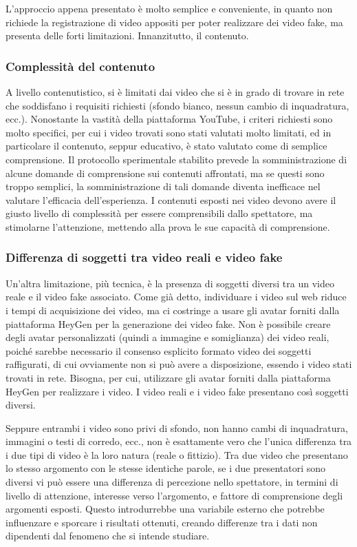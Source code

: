 L'approccio appena presentato è molto semplice e conveniente, in quanto non richiede la registrazione di video appositi per poter realizzare dei video fake, ma presenta delle forti limitazioni. Innanzitutto, il contenuto.

\subsubsection{Complessità del contenuto}

A livello contenutistico, si è limitati dai video che si è in grado di trovare in rete che soddisfano i requisiti richiesti (sfondo bianco, nessun cambio di inquadratura, ecc.). Nonostante la vastità della piattaforma YouTube, i criteri richiesti sono molto specifici, per cui i video trovati sono stati valutati molto limitati, ed in particolare il contenuto, seppur educativo, è stato valutato come di semplice comprensione. Il protocollo sperimentale stabilito prevede la somministrazione di alcune domande di comprensione sui contenuti affrontati, ma se questi sono troppo semplici, la somministrazione di tali domande diventa inefficace nel valutare l'efficacia dell'esperienza. I contenuti esposti nei video devono avere il giusto livello di complessità per essere comprensibili dallo spettatore, ma stimolarne l'attenzione, mettendo alla prova le sue capacità di comprensione.

\subsubsection{Differenza di soggetti tra video reali e video fake}

Un'altra limitazione, più tecnica, è la presenza di soggetti diversi tra un video reale e il video fake associato. Come già detto, individuare i video sul web riduce i tempi di acquisizione dei video, ma ci costringe a usare gli avatar forniti dalla piattaforma HeyGen per la generazione dei video fake. Non è possibile creare degli avatar personalizzati (quindi a immagine e somiglianza) dei video reali, poiché sarebbe necessario il consenso esplicito formato video dei soggetti raffigurati, di cui ovviamente non si può avere a disposizione, essendo i video stati trovati in rete. Bisogna, per cui, utilizzare gli avatar forniti dalla piattaforma HeyGen per realizzare i video. I video reali e i video fake presentano così soggetti diversi.

Seppure entrambi i video sono privi di sfondo, non hanno cambi di inquadratura, immagini o testi di corredo, ecc., non è esattamente vero che l'unica differenza tra i due tipi di video è la loro natura (reale o fittizio). Tra due video che presentano lo stesso argomento con le stesse identiche parole, se i due presentatori sono diversi vi può essere una differenza di percezione nello spettatore, in termini di livello di attenzione, interesse verso l'argomento, e fattore di comprensione degli argomenti esposti. Questo introdurrebbe una variabile esterno che potrebbe influenzare e sporcare i risultati ottenuti, creando differenze tra i dati non dipendenti dal fenomeno che si intende studiare.

